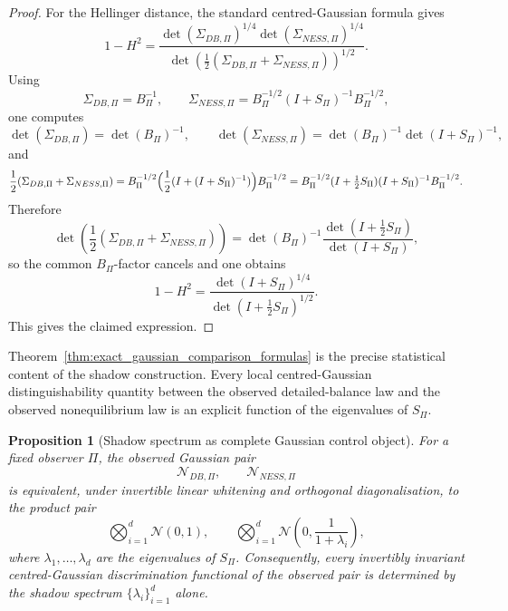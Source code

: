 \documentclass[11pt,a4paper]{article}
\numberwithin{equation}{section}
\theoremstyle{thmcompact}
\newtheorem{proposition}[theorem]{Proposition}
\theoremstyle{remark}
\begin{document}
\begin{proof}
For the Hellinger distance, the standard centred-Gaussian formula gives
\begin{equation}
1-H^2
=
\frac{\det(\Sigma_{DB,\Pi})^{1/4}\det(\Sigma_{NESS,\Pi})^{1/4}}
{\det\!\left(\frac12(\Sigma_{DB,\Pi}+\Sigma_{NESS,\Pi})\right)^{1/2}}.
\end{equation}
Using
\begin{equation}
\Sigma_{DB,\Pi}=B_\Pi^{-1},
\qquad
\Sigma_{NESS,\Pi}=B_\Pi^{-1/2}(I+S_\Pi)^{-1}B_\Pi^{-1/2},
\end{equation}
one computes
\begin{equation}
\det(\Sigma_{DB,\Pi})=\det(B_\Pi)^{-1},
\qquad
\det(\Sigma_{NESS,\Pi})=\det(B_\Pi)^{-1}\det(I+S_\Pi)^{-1},
\end{equation}
and
\begin{equation}
\frac12(\Sigma_{DB,\Pi}+\Sigma_{NESS,\Pi})
=
B_\Pi^{-1/2}\Bigl(\frac12(I+(I+S_\Pi)^{-1})\Bigr)B_\Pi^{-1/2}
=
B_\Pi^{-1/2}(I+\tfrac12 S_\Pi)(I+S_\Pi)^{-1}B_\Pi^{-1/2}.
\end{equation}
Therefore
\begin{equation}
\det\!\left(\frac12(\Sigma_{DB,\Pi}+\Sigma_{NESS,\Pi})\right)
=
\det(B_\Pi)^{-1}\frac{\det(I+\tfrac12 S_\Pi)}{\det(I+S_\Pi)},
\end{equation}
so the common \(B_\Pi\)-factor cancels and one obtains
\begin{equation}
1-H^2
=
\frac{\det(I+S_\Pi)^{1/4}}{\det(I+\tfrac12 S_\Pi)^{1/2}}.
\end{equation}
This gives the claimed expression.
\end{proof}

Theorem~\ref{thm:exact_gaussian_comparison_formulas} is the precise statistical content of the shadow construction. Every local centred-Gaussian distinguishability quantity between the observed detailed-balance law and the observed nonequilibrium law is an explicit function of the eigenvalues of \(S_\Pi\).

\begin{proposition}[Shadow spectrum as complete Gaussian control object]
\label{prop:shadow_control_object}
For a fixed observer \(\Pi\), the observed Gaussian pair
\begin{equation}
\mathcal N_{DB,\Pi},
\qquad
\mathcal N_{NESS,\Pi}
\end{equation}
is equivalent, under invertible linear whitening and orthogonal diagonalisation, to the product pair
\begin{equation}
\bigotimes_{i=1}^{d}\mathcal N(0,1),
\qquad
\bigotimes_{i=1}^{d}\mathcal N\!\left(0,\frac{1}{1+\lambda_i}\right),
\end{equation}
where \(\lambda_1,\dots,\lambda_d\) are the eigenvalues of \(S_\Pi\). Consequently, every invertibly invariant centred-Gaussian discrimination functional of the observed pair is determined by the shadow spectrum \(\{\lambda_i\}_{i=1}^{d}\) alone.
\end{proposition}
\end{document}

